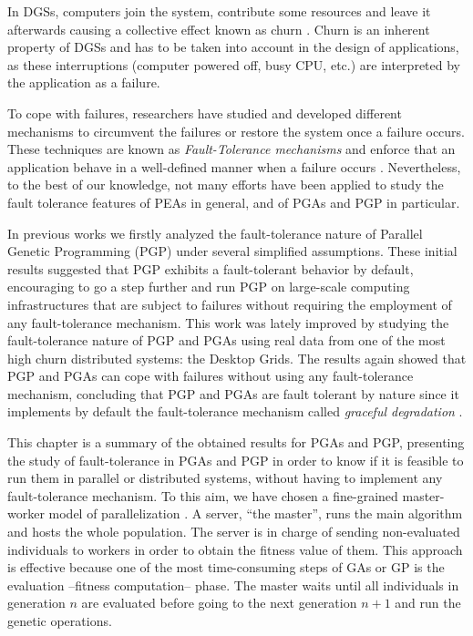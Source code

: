 \documentclass[graybox]{sty/svmult}
\begin{document}
In DGSs, computers join the system, contribute some resources 
and leave it afterwards causing a collective effect known as churn \cite{Stutzbach06Understanding}.
Churn is an inherent property of DGSs and has to be taken into 
account in the design of applications, as these interruptions (computer powered off, busy CPU, etc.) are interpreted by the application as a failure.   

To cope with failures, researchers have studied and developed different mechanisms to circumvent the failures or restore the
system once a failure occurs. These techniques are known as \emph{Fault-Tolerance mechanisms} and enforce that an
application behave in a well-defined manner when a failure occurs \cite{fault-tolerant-async}.
Nevertheless, to the best of our knowledge, not many efforts have been applied to study the fault
tolerance features of PEAs in general, and of PGAs and PGP in particular. 

In previous works \cite{cec-2007,gecco-2007-island-model} we firstly analyzed the fault-tolerance nature of Parallel Genetic
Programming (PGP) under several simplified assumptions. These initial results suggested that PGP exhibits a fault-tolerant behavior by
default, encouraging to go a step further and run PGP on large-scale computing infrastructures that are subject to failures
without requiring the employment of any fault-tolerance mechanism. This work was lately improved \cite{bads-2009, jfgcs-2010,
evocop-2010} by studying the fault-tolerance
nature of PGP and PGAs using real data from one of the most high churn
distributed systems: the Desktop Grids. The results again showed that PGP and PGAs can cope
with failures without using any fault-tolerance mechanism, concluding
that PGP and PGAs are fault tolerant by nature since it implements by default
the fault-tolerance mechanism called \emph{graceful degradation}
\cite{distributed-systems}. 

This chapter is a summary of the obtained results for PGAs and PGP, presenting the study of fault-tolerance in PGAs and PGP
in order to know if it is feasible to run them in parallel or distributed systems, without having to implement any fault-tolerance mechanism. 
To this aim, we have chosen a fine-grained master-worker model of parallelization \cite{spatially-structured-EAs}. A server, ``the master'', runs the
main algorithm and hosts the whole population. The server is in charge of sending non-evaluated individuals to workers in
order to obtain the fitness value of them. This approach is effective because one of the most time-consuming steps of GAs or
GP is the evaluation --fitness computation-- phase. The master waits until all individuals in generation $n$ are evaluated before
going to the next generation $n+1$ and run the genetic operations. 
\end{document}
